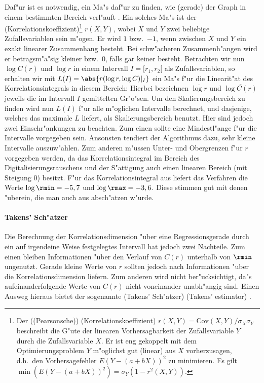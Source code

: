 Daf"ur ist es notwendig, ein Ma"s daf"ur zu finden, wie \naja(gerade) der Graph in einem
bestimmten Bereich verl"auft \cite{Raidl}. Ein solches Ma"s ist der 
\begriff(Korrelationskoeffizient)\footnote{Der (\begriff(Pearsonsche))
\begriff(Korrelationskoeffizient) $r(X,Y)=\mathrm{Cov}(X,Y)/\sigma_X \sigma_Y$ beschreibt die G"ute 
der linearen Vorhersagbarkeit der Zufallsvariable $Y$ durch die Zufallsvariable $X$. Er ist 
eng gekoppelt mit dem Optimierungsproblem $Y$ m"oglichst gut (linear) aus $X$
vorherzusagen, d.h.\  den Vorhersagefehler $E(Y-(a+bX))^2$ zu minimieren. Es gilt
$\min(E(Y-(a+bX))^2) = \sigma_Y(1-r^2(X,Y))$.} 
$r(X,Y)$, wobei $X$ und $Y$ zwei beliebige Zufallsvariablen sein m"ogen. Er wird $1$ 
bzw.\  $-1$, wenn zwischen $X$ und $Y$ ein exakt linearer Zusammenhang
besteht. Bei schw"acheren Zusammenh"angen wird er betragsm"a"sig kleiner bzw.\  $0$, falls 
gar keiner besteht. Betrachten wir nun $\log C(r)$ und $\log r$ in einem Intervall
$I=[r_1,r_2[$ als Zufallsvariablen, so erhalten wir mit $L(I)=\abs{ r(\log r, \log
C)\rvert_{I}}$ ein Ma"s f"ur die Linearit"at des Korrelationsintegrals in diesem
Bereich:
Hierbei bezeichnen $\overline{\log r}$ und $\overline{\log C(r)}$ jeweils die
im Intervall $I$ gemittelten Gr"o"sen. Um den Skalierungsbereich zu finden wird nun $L(I)$ 
f"ur alle m"oglichen Intervalle berechnet, und dasjenige, welches das maximale $L$
liefert, als Skalierungsbereich benutzt. Hier sind jedoch zwei Einschr"ankungen zu
beachten. Zum einen sollte eine Mindestl"ange f"ur die Intervalle vorgegeben
sein. Ansonsten tendiert der Algorithmus dazu, sehr kleine Intervalle auszuw"ahlen. Zum
anderen m"ussen Unter- und Obergrenzen f"ur $r$ vorgegeben werden, da das
Korrelationsintegral im Bereich des Digitalisierungsrauschens und der S"attigung  auch
einen linearen Bereich (mit Steigung 0) besitzt. F"ur das Korrelationsintegral aus  
liefert das Verfahren die Werte $\log \rmin = -5,7$ und $\log \rmax = -3,6$. Diese stimmen gut 
mit denen "uberein, die man auch aus  absch"atzen w"urde.

\paragraph{Takens' Sch"atzer}
\label{chaptakensest}
Die Berechnung der Korrelationsdimension "uber eine Regressionsgerade durch ein auf
irgendeine Weise festgelegtes Intervall hat jedoch zwei Nachteile. Zum einen bleiben
Informationen "uber den Verlauf von $C(r)$ unterhalb von $\rmin$ ungenutzt. Gerade kleine
Werte von $r$ sollten jedoch nach  Informationen "uber die
Korrelationsdimension liefern. Zum anderen wird nicht ber"ucksichtigt, da"s
aufeinanderfolgende Werte von $C(r)$ nicht voneinander unabh"angig sind. Einen Ausweg
hieraus bietet der sogenannte \begriff(Takens' Sch"atzer) (Takens' estimator) \cite{Takens85a}. 

